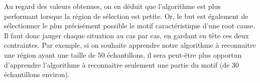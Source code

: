 Au regard des valeurs obtenues, on en déduit que l'algorithme est plus performant lorsque la région de sélection est petite. Or, le but est également de sélectionner le plus précisément possible le motif caractéristique d'une root cause. Il faut donc jauger chaque situation au cas par cas,  en gardant en tête ces deux contraintes. Par exemple, si on souhaite apprendre notre algorithme à reconnaitre une région ayant une taille de 50 échantillons, il sera peut-être plus opportun d'apprendre l'algorithme à reconnaitre seulement une partie du motif (de 30 échantillons environ).
